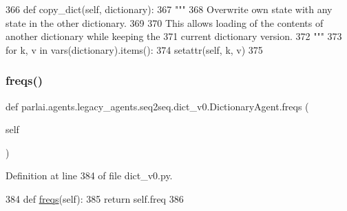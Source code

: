 \begin{DoxyCode}
366     \textcolor{keyword}{def }copy\_dict(self, dictionary):
367         \textcolor{stringliteral}{"""}
368 \textcolor{stringliteral}{        Overwrite own state with any state in the other dictionary.}
369 \textcolor{stringliteral}{}
370 \textcolor{stringliteral}{        This allows loading of the contents of another dictionary while keeping the}
371 \textcolor{stringliteral}{        current dictionary version.}
372 \textcolor{stringliteral}{        """}
373         \textcolor{keywordflow}{for} k, v \textcolor{keywordflow}{in} vars(dictionary).items():
374             setattr(self, k, v)
375 
\end{DoxyCode}
\mbox{\label{classparlai_1_1agents_1_1legacy__agents_1_1seq2seq_1_1dict__v0_1_1DictionaryAgent_a651f3045cd1e5237e7e5a1b54cc5f1c9}} 
\subsubsection{\texorpdfstring{freqs()}{freqs()}}
{\footnotesize\ttfamily def parlai.\+agents.\+legacy\+\_\+agents.\+seq2seq.\+dict\+\_\+v0.\+Dictionary\+Agent.\+freqs (\begin{DoxyParamCaption}\item[{}]{self }\end{DoxyParamCaption})}



Definition at line 384 of file dict\+\_\+v0.\+py.


\begin{DoxyCode}
384     \textcolor{keyword}{def }\hyperlink{namespaceparlai_1_1agents_1_1tfidf__retriever_1_1build__tfidf_a82fd1621e57caaa8ff7a9c27b0e94125}{freqs}(self):
385         \textcolor{keywordflow}{return} self.freq
386 
\end{DoxyCode}
\mbox{\label{classparlai_1_1agents_1_1legacy__agents_1_1seq2seq_1_1dict__v0_1_1DictionaryAgent_a6f403715cffdfde531b83a9bf6e0f750}} 
